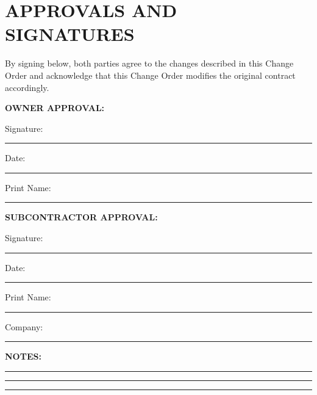 \documentclass[11pt,letterpaper]{article}
\begin{document}
\section*{APPROVALS AND SIGNATURES}

By signing below, both parties agree to the changes described in this Change Order and acknowledge that this Change Order modifies the original contract accordingly.

\vspace{12pt}

\textbf{OWNER APPROVAL:}

Signature: \rule{6cm}{0.4pt} Date: \rule{3cm}{0.4pt}

Print Name: \rule{6cm}{0.4pt}

\vspace{12pt}

\textbf{SUBCONTRACTOR APPROVAL:}

Signature: \rule{6cm}{0.4pt} Date: \rule{3cm}{0.4pt}

Print Name: \rule{6cm}{0.4pt}

Company: \rule{6cm}{0.4pt}

\vspace{12pt}

\textbf{NOTES:}

\rule{14cm}{0.4pt}

\rule{14cm}{0.4pt}

\rule{14cm}{0.4pt}
\end{document}
